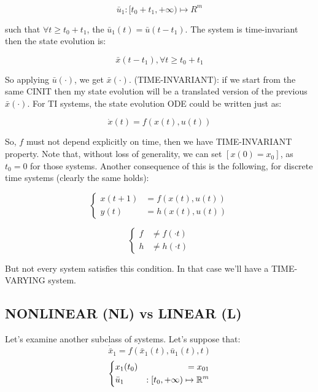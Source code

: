 \[
	\bar{u}_1 : [t_0 + t_1, +\infty) \mapsto R^m
\]

such that $\forall t \geq t_0 + t_1$, the $\bar{u}_1(t) = \bar{u}(t-t_1)$. The system is time-invariant then the state evolution is:

\[
	\bar{x}(t-t_1), \forall t \geq t_0 + t_1
\]

So applying $\bar{u}(\mathord{\cdot})$, we get $\bar{x}(\mathord{\cdot})$. (TIME-INVARIANT): if we start from the same CINIT then my state evolution will be a translated version of the previous $\bar{x}(\mathord{\cdot})$. For TI systems, the state evolution ODE could be written just as:

\begin{equation}
\dot{x}(t) = f(x(t),u(t))
\end{equation}

So, $f$ must not depend explicitly on time, then we have TIME-INVARIANT property. Note that, without loss of generality, we can set $[x(0) = x_0]$, as $t_0 = 0$ for those systems. Another consequence of this is the following, for discrete time systems (clearly the same holds):

\begin{equation}
\left\{
\begin{aligned}
x(t+1) &= f(x(t),u(t))\\
y(t) &= h(x(t),u(t))
\end{aligned} 
\right.
\end{equation}

\[
	\left\{
	\begin{aligned}
	f &\neq f(\mathord{\cdot}t) \\
	h &\neq h(\mathord{\cdot}t)
	\end{aligned}
	\right.
\]

But not every system satisfies this condition. In that case we'll have a TIME-VARYING system.


\subsection{NONLINEAR (NL) vs LINEAR (L)}

Let's examine another subclass of systems. Let's suppose that:
\[
	\dot{\bar{x}}_1 = f(\bar{x}_1(t), \bar{u}_1(t), t)
\]
\[
	\left\{
	\begin{aligned}
	&x_1(t_0) &= x_{01} \\
	&\bar{u}_1 &: [t_0, +\infty) \mapsto \mathbb{R}^m
	\end{aligned} 
	\right.
\]

